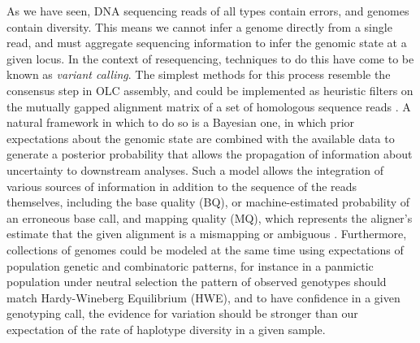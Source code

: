 As we have seen, DNA sequencing reads of all types contain errors, and genomes contain diversity.
This means we cannot infer a genome directly from a single read, and must aggregate sequencing information to infer the genomic state at a given locus.
In the context of resequencing, techniques to do this have come to be known as \emph{variant calling}.
The simplest methods for this process resemble the consensus step in OLC assembly, and could be implemented as heuristic filters on the mutually gapped alignment matrix of a set of homologous sequence reads \cite{koboldt2009varscan}.
A natural framework in which to do so is a Bayesian one, in which prior expectations about the genomic state are combined with the available data to generate a posterior probability that allows the propagation of information about uncertainty to downstream analyses.
Such a model allows the integration of various sources of information in addition to the sequence of the reads themselves, including the base quality (BQ), or machine-estimated probability of an erroneous base call, and mapping quality (MQ), which represents the aligner's estimate that the given alignment is a mismapping or ambiguous \cite{li2011statistical}.
Furthermore, collections of genomes could be modeled at the same time using expectations of population genetic and combinatoric patterns, for instance in a panmictic population under neutral selection the pattern of observed genotypes should match Hardy-Wineberg Equilibrium (HWE), and to have confidence in a given genotyping call, the evidence for variation should be stronger than our expectation of the rate of haplotype diversity in a given sample.

